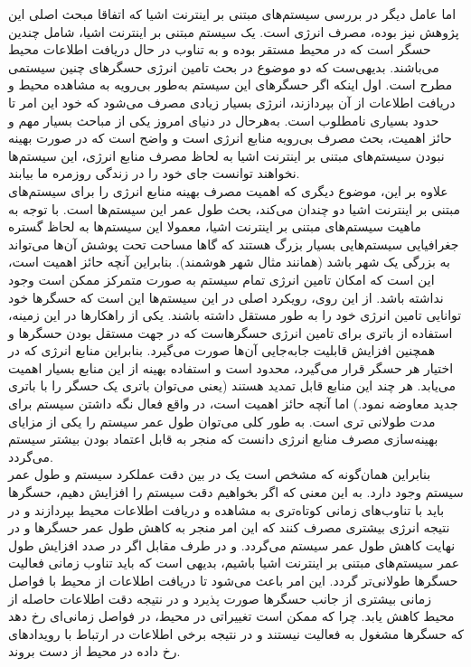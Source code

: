 اما عامل دیگر در بررسی سیستم‌های مبتنی بر اینترنت اشیا که اتفاقا مبحث اصلی این پژوهش نیز بوده، مصرف انرژی است. یک سیستم مبتنی بر اینترنت اشیا، شامل چندین حسگر است که در محیط مستقر بوده و به تناوب در حال دریافت اطلاعات محیط می‌باشند. بدیهی‌ست که دو موضوع در بحث تامین انرژی حسگرهای چنین سیستمی مطرح است. اول اینکه اگر حسگرهای این سیستم به‌طور بی‌رویه به مشاهده محیط و دریافت اطلاعات از آن بپردازند، انرژی بسیار زیادی مصرف می‌شود که خود این امر تا حدود بسیاری نامطلوب است. به‌هرحال در دنیای امروز یکی از مباحث بسیار مهم و حائز اهمیت، بحث مصرف بی‌رویه منابع انرژی است و واضح است که در صورت بهینه نبودن سیستم‌های مبتنی بر اینترنت اشیا به لحاظ مصرف منابع انرژی، این سیستم‌ها نخواهند توانست جای خود را در زندگی روزمره ما بیابند.\\
علاوه بر این، موضوع دیگری که اهمیت مصرف بهینه منابع انرژی را برای سیستم‌های مبتنی بر اینترنت اشیا دو چندان می‌کند، بحث طول عمر این سیستم‌ها است. با توجه به ماهیت سیستم‌های مبتنی بر اینترنت اشیا، معمولا این سیستم‌ها به لحاظ گستره جغرافیایی سیستم‌هایی بسیار بزرگ هستند که گاها مساحت تحت پوشش آن‌ها می‌تواند به بزرگی یک شهر باشد (همانند مثال شهر هوشمند). بنابراین آنچه حائز اهمیت است، این است که امکان تامین انرژی تمام سیستم به صورت متمرکز ممکن است وجود نداشته باشد. از این روی، رویکرد اصلی در این سیستم‌ها این است که حسگرها خود توانایی تامین انرژی خود را به طور مستقل داشته باشند. یکی از راهکارها در این زمینه، استفاده از باتری برای تامین انرژی حسگرهاست که در جهت مستقل بودن حسگرها و همچنین افزایش قابلیت جابه‌جایی آن‌ها صورت می‌گیرد. بنابراین منابع انرژی که در اختیار هر حسگر قرار می‌گیرد، محدود است و استفاده بهینه از این منابع بسیار اهمیت می‌یابد. هر چند این منابع قابل تمدید هستند (یعنی می‌توان باتری یک حسگر را با باتری جدید معاوضه نمود.) اما آنچه حائز اهمیت است، در واقع فعال نگه داشتن سیستم برای مدت طولانی تری است. به طور کلی می‌توان طول عمر سیستم را یکی از مزایای بهینه‌سازی مصرف منابع انرژی دانست که منجر به قابل اعتماد بودن بیشتر سیستم می‌گردد.\\
بنابراین همان‌گونه که مشخص است یک  در بین دقت عملکرد سیستم و طول عمر سیستم وجود دارد. به این معنی که اگر بخواهیم دقت سیستم را افزایش دهیم، حسگرها باید با تناوب‌های زمانی کوتاه‌تری به مشاهده و دریافت اطلاعات محیط بپردازند و در نتیجه انرژی بیشتری مصرف کنند که این امر منجر به کاهش طول عمر حسگرها و در نهایت کاهش طول عمر سیستم می‌گردد. و در طرف مقابل اگر در صدد افزایش طول عمر سیستم‌های مبتنی بر اینترنت اشیا باشیم، بدیهی است که باید تناوب زمانی فعالیت حسگرها طولانی‌تر گردد. این امر باعث می‌شود تا دریافت اطلاعات از محیط با فواصل زمانی بیشتری از جانب حسگرها صورت پذیرد و در نتیجه دقت اطلاعات حاصله از محیط کاهش یابد. چرا که ممکن است تغییراتی در محیط، در فواصل زمانی‌ای رخ دهد که حسگرها مشغول به فعالیت نیستند و در نتیجه برخی اطلاعات در ارتباط با رویدادهای رخ داده در محیط از دست بروند.\\
